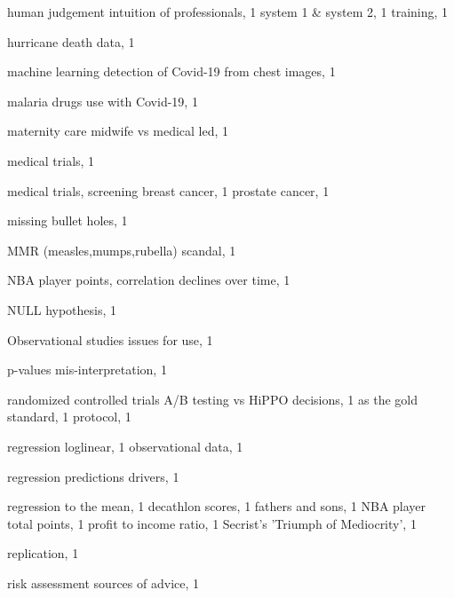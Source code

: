 \documentclass[
  10pt,
  b5paper]{book}
\begin{document}
\begin{theindex}
  \indexspace

  \item human judgement
    \subitem intuition of professionals, 1
    \subitem system 1 \& system 2, 1
    \subitem training, 1
  \item hurricane death data, 1

  \indexspace

  \item machine learning
    \subitem detection of Covid-19 from chest images, 1
  \item malaria drugs
    \subitem use with Covid-19, 1
  \item maternity care
    \subitem midwife vs medical led, 1
  \item medical trials, 1
  \item medical trials, screening
    \subitem breast cancer, 1
    \subitem prostate cancer, 1
  \item missing bullet holes, 1
  \item MMR (measles,mumps,rubella) scandal, 1

  \indexspace

  \item NBA player points, correlation declines over time, 1
  \item NULL hypothesis, 1

  \indexspace

  \item Observational studies
    \subitem issues for use, 1

  \indexspace

  \item p-values
    \subitem mis-interpretation, 1

  \indexspace

  \item randomized controlled trials
    \subitem A/B testing vs HiPPO decisions, 1
    \subitem as the gold standard, 1
    \subitem protocol, 1
  \item regression
    \subitem loglinear, 1
    \subitem observational data, 1
  \item regression predictions
    \subitem drivers, 1
  \item regression to the mean, 1
    \subitem decathlon scores, 1
    \subitem fathers and sons, 1
    \subitem NBA player total points, 1
    \subitem profit to income ratio, 1
    \subitem Secrist's 'Triumph of Mediocrity', 1
  \item replication, 1
  \item risk assessment
    \subitem sources of advice, 1


\end{theindex}
\end{document}
